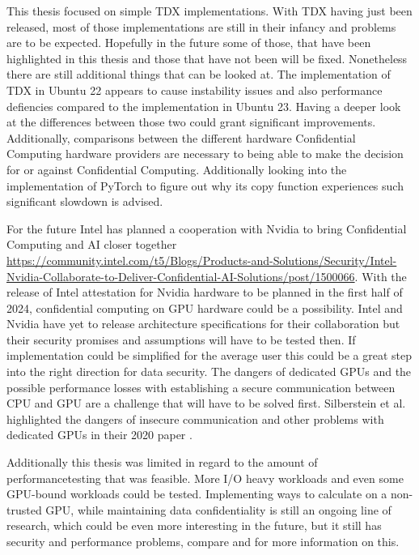 
This thesis focused on simple TDX implementations. With TDX having just been released, most of those implementations are still in their infancy and problems are to be expected. Hopefully in the future some of those, that have been highlighted in this thesis and those that have not been will be fixed. Nonetheless there are still additional things that can be looked at. The implementation of TDX in Ubuntu 22 appears to cause instability issues and also performance defiencies compared to the implementation in Ubuntu 23. Having a deeper look at the differences between those two could grant significant improvements. Additionally, comparisons between the different hardware Confidential Computing hardware providers are necessary to being able to make the decision for or against Confidential Computing. Additionally looking into the implementation of PyTorch to figure out why its copy function experiences such significant slowdown is advised. 

For the future Intel has planned a cooperation with Nvidia to bring Confidential Computing and AI closer together \url{https://community.intel.com/t5/Blogs/Products-and-Solutions/Security/Intel-Nvidia-Collaborate-to-Deliver-Confidential-AI-Solutions/post/1500066}. With the release of Intel attestation for Nvidia hardware to be planned in the first half of 2024, confidential computing on GPU hardware could be a possibility. Intel and Nvidia have yet to release architecture specifications for their collaboration but their security promises and assumptions will have to be tested then. If implementation could be simplified for the average user this could be a great step into the right direction for data security. The dangers of dedicated GPUs and the possible performance losses with establishing a secure communication between CPU and GPU are a challenge that will have to be solved first. Silberstein et al. highlighted the dangers of insecure communication and other problems with dedicated GPUs in their 2020 paper \cite{zhu_enabling_2020}.

Additionally this thesis was limited in regard to the amount of performancetesting that was feasible. More I/O heavy workloads and even some GPU-bound workloads could be tested. Implementing ways to calculate on a non-trusted GPU, while maintaining data confidentiality is still an ongoing line of research, which could be even more interesting in the future, but it still has security and performance problems, compare \cite{ogburn_homomorphic_2013} and \cite{li_security_2020} for more information on this.

